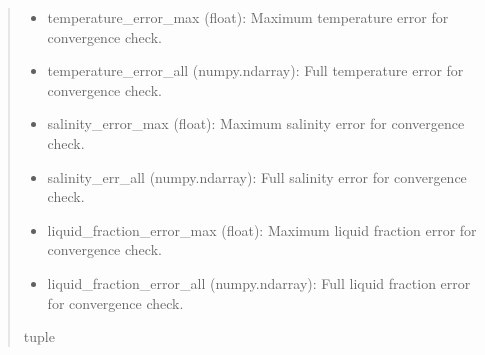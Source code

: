 \documentclass[a4paper,11pt,english,openany]{sphinxmanual}
\begin{document}
\begin{fulllineitems}
\begin{quote}
\begin{description}
\begin{itemize}
\end{itemize}

\sphinxAtStartPar
\begin{description}
\begin{itemize}
\item {} 
\sphinxAtStartPar
temperature\_error\_max (float): Maximum temperature error for convergence check.

\item {} 
\sphinxAtStartPar
temperature\_error\_all (numpy.ndarray): Full temperature error for convergence check.

\item {} 
\sphinxAtStartPar
salinity\_error\_max (float): Maximum salinity error for convergence check.

\item {} 
\sphinxAtStartPar
salinity\_err\_all (numpy.ndarray): Full salinity error for convergence check.

\item {} 
\sphinxAtStartPar
liquid\_fraction\_error\_max (float): Maximum liquid fraction error for convergence check.

\item {} 
\sphinxAtStartPar
liquid\_fraction\_error\_all (numpy.ndarray): Full liquid fraction error for convergence check.

\end{itemize}

\end{description}


\sphinxAtStartPar
tuple

\end{description}\end{quote}

\end{fulllineitems}

\end{document}
